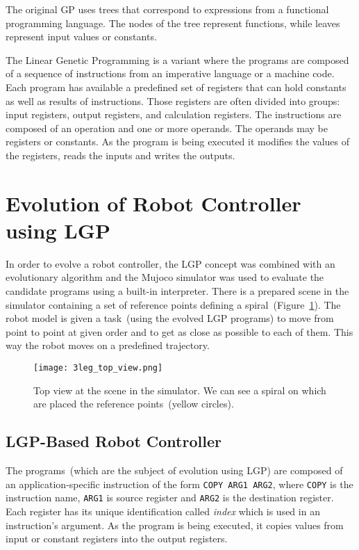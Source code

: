 \documentclass{ExcelAtFIT}
\begin{document}
The original GP uses trees that correspond to expressions from a functional programming language.
The nodes of the tree represent functions, while leaves represent input values or constants.

The Linear Genetic Programming is a variant where the programs are composed of a sequence of instructions from an imperative language or a machine code.
Each program has available a predefined set of registers that can hold constants as well as results of instructions.
Those registers are often divided into groups: input registers, output registers, and calculation registers.
The instructions are composed of an operation and one or more operands.
The operands may be registers or constants.
As the program is being executed it modifies the values of the registers, reads the inputs and writes the outputs.


\section{Evolution of Robot Controller using LGP}
\label{sec:ExperimentsSetup}
In order to evolve a robot controller, the LGP concept was combined with an evolutionary algorithm and the Mujoco simulator\cite{Todorov2012} was used to evaluate the candidate programs using a built-in interpreter.
There is a prepared scene in the simulator containing a set of reference points defining a spiral~(Figure~\ref{fig:SpiralTop}).
The robot model is given a task~(using the evolved LGP programs) to move from point to point at given order and to get as close as possible to each of them.
This way the robot moves on a predefined trajectory.

\begin{figure}[h]
\centering
{\texttt{[image: 3leg\_top\_view.png]}}
\caption{Top view at the scene in the simulator.
We can see a spiral on which are placed the reference points~(yellow circles).
}
\label{fig:SpiralTop}
\end{figure}

\subsection{LGP-Based Robot Controller}
\label{subsec:lgp-basedRobotController}
The programs~(which are the subject of evolution using LGP) are composed of an application-specific instruction of the form \texttt{COPY ARG1 ARG2}, where \texttt{COPY} is the instruction name, \texttt{ARG1} is source register and \texttt{ARG2} is the destination register.
Each register has its unique identification called \textit{index} which is used in an instruction's argument.
As the program is being executed, it copies values from input or constant registers into the output registers.
\end{document}
